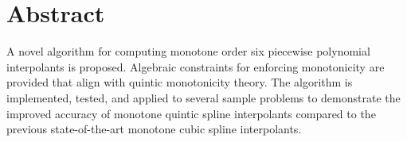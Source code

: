 \documentclass{scspaperproc}
\newcommand\changed[2][]{{\cbstart{\color{red}#2}\cbend}} %
\theoremstyle{scsthe}
\begin{document}
\maketitle



\section*{Abstract}

A novel algorithm for computing monotone order six piecewise
polynomial interpolants is proposed. Algebraic constraints for
enforcing monotonicity are provided that align with quintic
monotonicity theory. The algorithm is implemented, tested, and applied
to several sample problems to demonstrate the improved accuracy of
monotone quintic spline interpolants compared to the previous
state-of-the-art monotone cubic spline interpolants.

\end{document}
